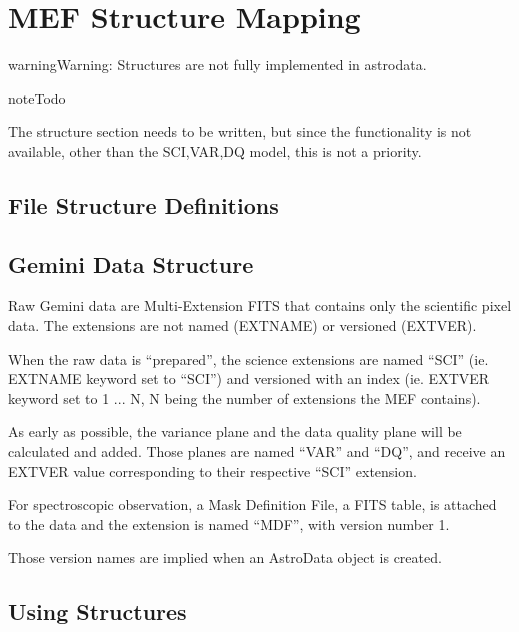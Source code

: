 \documentclass[letterpaper,10pt,english]{sphinxmanual}
\begin{document}
\chapter{MEF Structure Mapping}
\label{structure:mef-structure-mapping}\label{structure::doc}\label{structure:structure}
\begin{notice}{warning}{Warning:}
Structures are not fully implemented in astrodata.
\end{notice}

\begin{notice}{note}{Todo}

The structure section needs to be written, but since the functionality
is not available, other than the SCI,VAR,DQ model, this is not a priority.
\end{notice}


\section{File Structure Definitions}
\label{structure:file-structure-definitions}

\section{Gemini Data Structure}
\label{structure:gemini-data-structure}
Raw Gemini data are Multi-Extension FITS that contains only the scientific
pixel data.  The extensions are not named (EXTNAME) or versioned (EXTVER).

When the raw data is ``prepared'', the science extensions are named ``SCI''
(ie. EXTNAME keyword set to ``SCI'') and versioned with an index (ie.
EXTVER keyword set to 1 ... N, N being the number of extensions the MEF
contains).

As early as possible, the variance plane and the data quality plane will
be calculated and added.  Those planes are named ``VAR'' and ``DQ'', and
receive an EXTVER value corresponding to their respective ``SCI'' extension.

For spectroscopic observation, a Mask Definition File, a FITS table, is attached to the
data and the extension is named ``MDF'', with version number 1.

Those version names are implied when an AstroData object is created.


\section{Using Structures}
\label{structure:using-structures}
\end{document}
